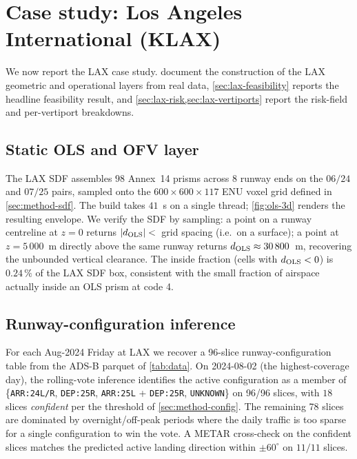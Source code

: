 \section{Case study: Los Angeles International (KLAX)}
\label{sec:lax}

We now report the LAX case study.  document
the construction of the LAX geometric and operational layers from real data,
\cref{sec:lax-feasibility} reports the headline feasibility result, and
\cref{sec:lax-risk,sec:lax-vertiports} report the risk-field and per-vertiport
breakdowns.

\subsection{Static OLS and OFV layer}
\label{sec:lax-sdf}

The LAX SDF assembles $98$ Annex~14 prisms across $8$ runway ends on the
$06/24$ and $07/25$ pairs, sampled onto the $600 \times 600 \times 117$ ENU
voxel grid defined in \cref{sec:method-sdf}. The build takes $41$~s on a
single thread; \cref{fig:ols-3d} renders the resulting envelope. We verify
the SDF by sampling: a point on a runway centreline at $z=0$ returns
$|d_{\mathrm{OLS}}| < $~grid spacing (i.e.\ on a surface); a point at $z = 5\,000$~m
directly above the same runway returns $d_{\mathrm{OLS}} \approx 30\,800$~m, recovering
the unbounded vertical clearance. The inside fraction (cells with
$d_{\mathrm{OLS}} < 0$) is $0.24\,\%$ of the LAX SDF box, consistent with the small
fraction of airspace actually inside an OLS prism at code 4.

\subsection{Runway-configuration inference}
\label{sec:lax-config}

For each Aug-2024 Friday at LAX we recover a 96-slice runway-configuration
table from the ADS-B parquet of \cref{tab:data}. On 2024-08-02 (the
highest-coverage day), the rolling-vote inference identifies the active
configuration as a member of \{\texttt{ARR:24L/R}, \texttt{DEP:25R},
\texttt{ARR:25L} + \texttt{DEP:25R}, \texttt{UNKNOWN}\} on 96/96 slices, with
$18$ slices \emph{confident} per the threshold of \cref{sec:method-config}.
The remaining 78 slices are dominated by overnight/off-peak periods where
the daily traffic is too sparse for a single configuration to win the vote.
A METAR cross-check on the confident slices matches the predicted active
landing direction within $\pm60^\circ$ on $11/11$ slices.


